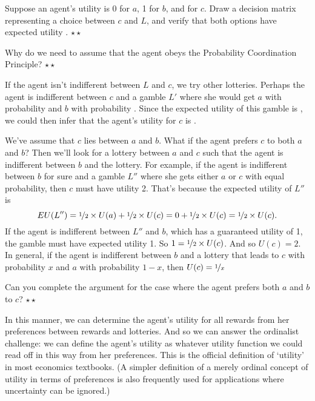 \begin{exercise}
  Suppose an agent's utility is 0 for $a$, 1 for $b$, and
   for $c$. Draw a decision matrix representing a
  choice between $c$ and $L$, and verify that both options have
  expected utility . $\star\star$
\end{exercise}

\begin{exercise}
  Why do we need to assume that the agent obeys the Probability
  Coordination Principle? $\star\star$
\end{exercise}

If the agent isn't indifferent between $L$ and $c$, we try other
lotteries.%
Perhaps the agent is indifferent between $c$ and a gamble $L'$ where
she would get $a$ with probability  and $b$ with
probability . Since the expected utility of this gamble
is , we could then infer that the agent's utility for
$c$ is .

We've assume that $c$ lies between $a$ and $b$. What if the agent
prefers $c$ to both $a$ and $b$? Then we'll look for a lottery between
$a$ and $c$ such that the agent is indifferent between $b$ and the
lottery. For example, if the agent is indifferent between $b$ for sure
and a gamble $L''$ where she gets either $a$ or $c$ with equal
probability, then $c$ must have utility 2. That's because the expected
utility of $L''$ is
\[
  EU(L'') = \nicefrac{1}{2} \times U(a) + \nicefrac{1}{2} \times U(c) =  
   0 + \nicefrac{1}{2} \times U(c) = \nicefrac{1}{2} \times U(c). 
\]
If the agent is indifferent between $L''$ and $b$, which has a
guaranteed utility of 1, the gamble must have expected utility 1. So
$1 = \nicefrac{1}{2} \times U(c)$. And so $U(c) = 2$. In general, if
the agent is indifferent between $b$ and a lottery that leads to $c$
with probability $x$ and $a$ with probability $1-x$, then $U(c) =
\nicefrac{1}{x}$


\begin{exercise}
  Can you complete the argument for the case where the agent prefers
  both $a$ and $b$ to $c$? $\star\star$
\end{exercise}

In this manner, we can determine the agent's utility for all rewards
from her preferences between rewards and lotteries. And so we can
answer the ordinalist challenge: we can define the agent's utility as
whatever utility function we could read off in this way from her
preferences. This is the official definition of `utility' in most
economics textbooks. (A simpler definition of a merely ordinal concept
of utility in terms of preferences is also frequently used for
applications where uncertainty can be ignored.)

